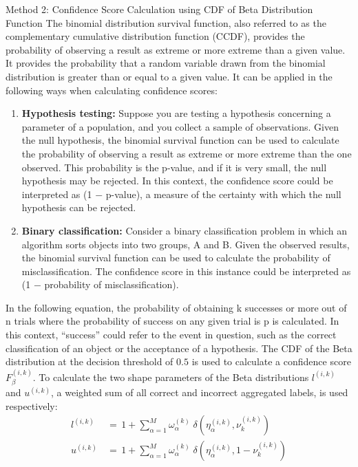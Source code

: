 \begin{mymdframed}{Method 2: Confidence Score Calculation using CDF of Beta Distribution Function}
    The binomial distribution survival function, also referred to as the complementary cumulative distribution function (CCDF), provides the probability of observing a result as extreme or more extreme than a given value. It provides the probability that a random variable drawn from the binomial distribution is greater than or equal to a given value. It can be applied in the following ways when calculating confidence scores:
    \begin{enumerate}%
        \item \textbf{Hypothesis testing:}
        Suppose you are testing a hypothesis concerning a parameter of a population, and you collect a sample of observations. Given the null hypothesis, the binomial survival function can be used to calculate the probability of observing a result as extreme or more extreme than the one observed. This probability is the p-value, and if it is very small, the null hypothesis may be rejected. In this context, the confidence score could be interpreted as (1 $-$ p-value), a measure of the certainty with which the null hypothesis can be rejected.

        \item \textbf{Binary classification:} Consider a binary classification problem in which an algorithm sorts objects into two groups, A and B. Given the observed results, the binomial survival function can be used to calculate the probability of misclassification. The confidence score in this instance could be interpreted as (1 $-$ probability of misclassification).
    \end{enumerate}

    In the following equation, the probability of obtaining k successes or more out of n trials where the probability of success on any given trial is p is calculated. In this context, ``success'' could refer to the event in question, such as the correct classification of an object or the acceptance of a hypothesis. The CDF of the Beta distribution at the decision threshold of $0.5 $ is used to calculate a confidence score $F_{\beta}^{(i,k)}$. To calculate the two shape parameters of the Beta distributions $l^{(i,k)}$ and $u^{(i,k)}$, a weighted sum of all correct and incorrect aggregated labels, is used respectively:
    \begin{equation}
        \begin{aligned}
            l^{(i,k)} \, & = \, 1 + \sum_{\alpha=1}^{M} \omega_{\alpha}^{(k)} \; \delta\left(\eta_{\alpha}^{(i,k)}, \nu_{k}^{(i,k)}\right) \\
            u^{(i,k)} \, & = \, 1 + \sum_{\alpha=1}^{M} \omega_{\alpha}^{(k)} \; \delta\left(\eta_{\alpha}^{(i,k)}, 1 - \nu_{k}^{(i,k)}\right)
        \end{aligned}
        \label{eq:crowd.Eq.14.beta_l_u}
    \end{equation}


\end{mymdframed}
